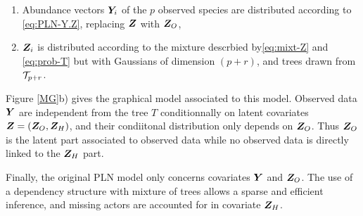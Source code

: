  \begin{enumerate}[($i$)]
\item  Abundance vectors $\boldsymbol{Y}_i$ of the  $p$ observed species are distributed according to \eqref{eq:PLN-Y.Z}, replacing $\boldsymbol{Z}$ with $\boldsymbol{Z}_O$,
\item   $\boldsymbol{Z}_i$ is distributed according to the mixture descrbied by\eqref{eq:mixt-Z} and \eqref{eq:prob-T} but with Gaussians of dimension $(p+r)$, and trees drawn from $\mathcal{T}_{p+r}$.
\end{enumerate}
Figure \ref{MG}b) gives the graphical model associated to this model. Observed data $\boldsymbol{Y}$ are independent from the tree  $T$ conditionnally on latent covariates $\boldsymbol{Z}=(\boldsymbol{Z}_O,\boldsymbol{Z}_H)$, and their condiitonal distribution only depends on $\boldsymbol{Z}_O$. Thus $\boldsymbol{Z}_O$ is the latent part associated to observed data while no observed data is directly linked to the   $\boldsymbol{Z}_H$ part.

Finally, the original PLN model only concerns covariates $\boldsymbol{Y}$ and $\boldsymbol{Z}_O$. The use of a dependency structure with mixture of trees allows a sparse and efficient inference, and missing actors are accounted for in covariate $\boldsymbol{Z}_H$.